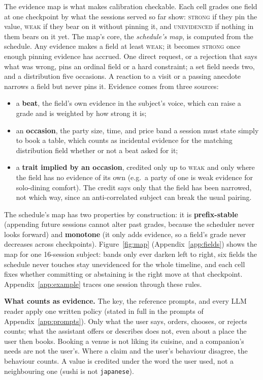\documentclass{article}
\begin{document}
The evidence map is what makes calibration checkable. Each cell grades one field at one checkpoint
by what the sessions served so far show: \textsc{strong} if they pin the value, \textsc{weak} if
they bear on it without pinning it, and \textsc{unevidenced} if nothing in them bears on it yet.
The map's core, the \emph{schedule's map}, is computed from the schedule. Any evidence makes a field
at least \textsc{weak}; it becomes \textsc{strong} once enough pinning evidence has accrued. One
direct request, or a rejection that says what was wrong, pins an ordinal field or a hard
constraint; a set field needs two, and a distribution five occasions. A reaction to a visit or a
passing anecdote narrows a field but never pins it. Evidence comes from three sources:
\begin{itemize}
  \item a \textbf{beat}, the field's own evidence in the subject's voice, which can raise a grade and
  is weighted by how strong it is;
  \item an \textbf{occasion}, the party size, time, and price band a session must state simply to
  book a table, which counts as incidental evidence for the matching distribution field
  whether or not a beat asked for it;
  \item a \textbf{trait implied by an occasion}, credited only up to \textsc{weak} and only where
  the field has no evidence of its own (e.g.\ a party of one is weak evidence for
  solo-dining comfort). The credit says only that the field has been narrowed, not which way,
  since an anti-correlated subject can break the usual pairing.
\end{itemize}
The schedule's map has two properties by construction: it is \textbf{prefix-stable} (appending
future sessions cannot alter past grades, because the scheduler never looks forward) and
\textbf{monotone} (it only adds evidence, so a field's grade never decreases across checkpoints).
Figure~\ref{fig:map} (Appendix~\ref{app:fields}) shows the map for one 16-session
subject: bands only ever darken left to right, six fields the schedule never touches stay
unevidenced for the whole timeline, and each cell fixes whether committing or abstaining is the
right move at that checkpoint. Appendix~\ref{app:example} traces one session through these rules.

\textbf{What counts as evidence.} The key, the reference prompts, and every LLM reader apply one
written policy (stated in full in the prompts of Appendix~\ref{app:prompts}). Only what the user
says, orders, chooses, or rejects counts; what the assistant offers or describes does not, even
about a place the user then books. Booking a venue is not liking its cuisine, and a companion's
needs are not the user's. Where a claim and the user's behaviour disagree, the behaviour counts. A
value is credited under the word the user used, not a neighbouring one (sushi is not
\texttt{japanese}).
\end{document}
